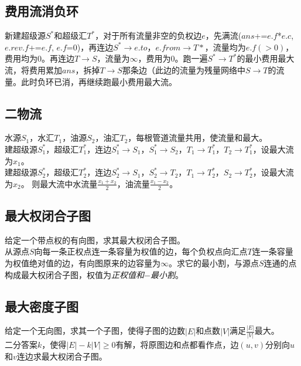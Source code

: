 	\subsection*{费用流消负环}
		新建超级源$ S^\ast $和超级汇$ T^\ast $，对于所有流量非空的负权边$ e $，先满流($ ans $+=$ e.f $*$ e.c $, $  e.rev.f $+=$ e.f $, $ e.f $=$ 0 $)，再连边$ S^\ast \to e.to $，$ e.from \to T\ast $，流量均为$ e.f (> 0) $，费用均为$ 0 $。再连边$ T \to S $，流量为$ \infty $，费用为$ 0 $。跑一遍$ S^\ast \to T^\ast $的最小费用最大流，将费用累加$ ans $，拆掉$ T \to S $那条边（此边的流量为残量网络中$ S \to T $的流量。此时负环已消，再继续跑最小费用最大流。
	\subsection*{二物流}
		水源$ S_1 $，水汇$ T_1 $，油源$ S_2 $，油汇$ T_2 $，每根管道流量共用，使流量和最大。
		\\建超级源$ S_1^\ast $，超级汇$ T_1^\ast $，连边$ S_1^\ast \to S_1 $，$ S_1^\ast \to S_2 $，$ T_1 \to T_1^\ast $，$ T_2 \to T_1^\ast $，设最大流为$ x_1 $。
		\\建超级源$ S_2^\ast $，超级汇$ T_2^\ast $，连边$ S_2^\ast \to S_1 $，$ S_2^\ast \to T_2 $，$ T_1 \to T_2^\ast $，$ S_2 \to T_2^\ast $，设最大流为$ x_2 $。
		则最大流中水流量$ \frac{x_1 + x_2}{2} $，油流量$ \frac{x_1 - x_2}{2} $。
	\subsection*{最大权闭合子图}
		给定一个带点权的有向图，求其最大权闭合子图。
		\\从源点$ S $向每一条正权点连一条容量为权值的边，每个负权点向汇点$ T $连一条容量为权值绝对值的边，有向图原来的边容量为$ \infty $。求它的最小割，与源点$ S $连通的点构成最大权闭合子图，权值为\textit{正权值和}$ - $\textit{最小割}。
	\subsection*{最大密度子图}
		给定一个无向图，求其一个子图，使得子图的边数$ \left| E \right| $和点数$ \left| V \right| $满足$ \frac{\left| E \right|}{\left| V \right|} $最大。
		\\二分答案$ k $，使得$ \left| E \right| - k \left| V \right| \geq 0 $有解，将原图边和点都看作点，边$ (u, v) $分别向$ u $和$ v $连边求最大权闭合子图。
		
